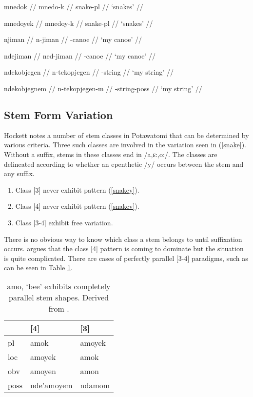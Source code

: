 \pex\label{snake}
\a\label{snakev}
\begingl
\gla mnedok // 
\glb mnedo-k //
\glc snake-{\sc pl} //
\glft `snakes' //
\endgl

\a\label{snakey}
\begingl
\gla mnedoyek //
\glb mnedoy-k //
\glc snake-{\sc pl} //
\glft `snakes'  //
\endgl
\xe

\pex\label{canoe}
\a\label{canoeshort}
\begingl
\gla njiman // 
\glb n-jiman //
-canoe //
\glft `my canoe' //
\endgl

\a\label{canoelong}
\begingl
\gla ndejiman //
\glb ned-jiman //
-canoe //
\glft `my canoe'  //
\endgl
\xe

\pex\label{string}
\a\label{string-}
\begingl
\gla ndekobjegen // 
\glb n-tekopjegen //
-string //
\glft `my string' //
\endgl

\a\label{string-m}
\begingl
\gla ndekobjegnem //
\glb n-tekopjegen-m //
-string-{\sc poss} //
\glft `my string'  //
\endgl
\xe

\subsection{Stem Form Variation}

Hockett notes a number of stem classes in Potawatomi that can be
determined by various criteria. Three such classes are involved in the
variation seen in (\ref{snake}). Without a suffix, stems in these
classes end in /a,ɛ:,o:/. The classes are delineated according to
whether an epenthetic /y/ occurs between the stem and any suffix.

\begin{enumerate}
\item Class [3] never exhibit pattern (\ref{snakey}).
\item Class [4] never exhibit pattern (\ref{snakev}).
\item Class [3-4] exhibit free variation.
\end{enumerate}

There is no obvious way to know which class a stem belongs to until
suffixation occurs. \citet{lockwood2017potawatomi} argues that the
class [4] pattern is coming to dominate but the situation is quite
complicated. There are cases of perfectly parallel [3-4] paradigms,
such as can be seen in Table \ref{bee}.

\begin{table}[H]
  \centering
  \begin{tabular}{l|ll}
             & [4] & [3] \\\hline
    {\sc pl} & amok & amoyek \\
    {\sc loc} & amoyek & amok \\
    {\sc obv} & amoyen & amon \\
    {\sc poss} & nde'amoyem & ndamom \\
  \end{tabular}
  \caption{{\sc amo}, `bee' exhibits completely parallel stem
    shapes. Derived from \citet[p.\ 86]{lockwood2017potawatomi}.}
  \label{bee}
\end{table}

